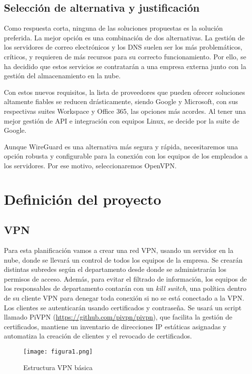 \subsection{Selección de alternativa y justificación}
Como respuesta corta, ninguna de las soluciones propuestas es la solución preferida. La mejor opción es una combinación de dos alternativas. La gestión de los servidores de correo electrónicos y los DNS suelen ser los más problemáticos, críticos, y requieren de más recursos para su correcto funcionamiento. Por ello, se ha decidido que estos servicios se contratarán a una empresa externa junto con la gestión del almacenamiento en la nube.

Con estos nuevos requisitos, la lista de proveedores que pueden ofrecer soluciones altamente fiables se reducen drásticamente, siendo Google y Microsoft, con sus respectivas suites Workspace y Office 365, las opciones más acordes. Al tener una mejor gestión de API e integración con equipos Linux, se decide por la suite de Google.

Aunque WireGuard es una alternativa más segura y rápida, necesitaremos una opción robusta y configurable para la conexión con los equipos de los empleados a los servidores. Por ese motivo, seleccionaremos OpenVPN.

\section{Definición del proyecto}
\subsection{VPN}
Para esta planificación vamos a crear una red VPN, usando un servidor en la nube, donde se llevará un control de todos los equipos de la empresa. Se crearán distintas subredes según el departamento desde donde se administrarán los permisos de acceso. Además, para evitar el filtrado de información, los equipos de los responsables de departamento contarán con un \textit{kill switch}, una política dentro de su cliente VPN para denegar toda conexión si no se está conectado a la VPN. Los clientes se autenticarán usando certificados y contraseña. Se usará un script llamado PiVPN (\underline{https://github.com/pivpn/pivpn}), que facilita la gestión de certificados, mantiene un inventario de direcciones IP estáticas asignadas y automatiza la creación de clientes y el revocado de certificados.
\begin{figure}[H]
  \centering
  \texttt{[image: figura1.png]}
  \caption{Estructura VPN básica}
  \label{fig:VPNbasico}
\end{figure}

